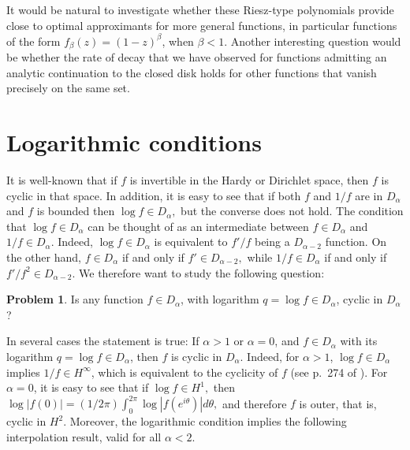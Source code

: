 \documentclass[11 pt,reqno]{amsart}
\theoremstyle{definition}
\newtheorem{prob}[thm]{Problem}
\theoremstyle{remark}
\numberwithin{equation}{section} \numberwithin{figure}{section}
\begin{document}
It would be natural to investigate whether these Riesz-type polynomials provide close to
optimal approximants for more general functions, in particular functions of the form $f_{\beta}(z)=(1-z)^{\beta}$, when $\beta<1$.
Another interesting question would be whether the rate of decay that we have observed for functions admitting an analytic continuation
to the closed disk holds for other functions that vanish precisely on the same set.



\section{Logarithmic conditions}\label{log}

It is well-known that if $f$ is invertible in the Hardy or Dirichlet space, then $f$ is cyclic in that space.
In addition, it is easy to see that if both $f$ and $1/f$ are in $D_\alpha$ and
$f$ is bounded then $\log f \in D_\alpha,$ but the converse does not
hold.  The condition that $\log f \in D_\alpha$ can be thought of as an intermediate
between $f \in D_\alpha$ and $1/f \in D_\alpha$. Indeed, $\log f \in D_\alpha$ is
equivalent to $f'/f$ being a $D_{\alpha-2}$ function. On the other hand,  $f \in
D_\alpha$ if and only if $f' \in D_{\alpha-2},$ while $1/f \in D_\alpha$
if and only if $f'/f^2 \in D_{\alpha-2}$.
We therefore want to study the following question:
\begin{prob}\label{prob1}
Is any function $f \in D_\alpha$, with logarithm $q= \log f \in
D_\alpha$, cyclic in $D_\alpha$?
\end{prob}


In several cases the statement is true:
If $\alpha >1$ or $\alpha = 0$, and $f \in D_\alpha$ with its
logarithm $q= \log f \in D_\alpha$, then $f$ is cyclic in
$D_\alpha$.  Indeed, for $\alpha >1$, $\log f \in D_\alpha$ implies $1/f \in
H^\infty$, which is equivalent to the cyclicity of $f$ (see p.~274 of \cite{BS84}). For $\alpha=0$, it is easy to see that if $\log f \in H^1,$
then $\log|f(0)| = (1/2\pi) \int_0^{2\pi} \log|f(e^{i \theta})| d \theta,$ and therefore
 $f$ is outer, that is, cyclic in $H^2$.
Moreover, the logarithmic condition implies the following
interpolation result, valid for all $\alpha <2$.
\end{document}
